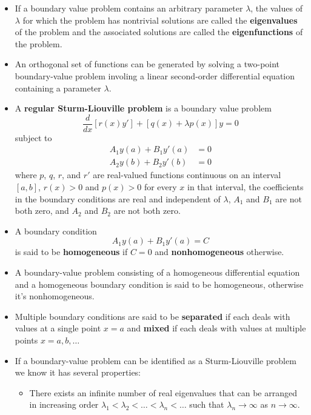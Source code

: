 \documentclass{article}
\begin{document}
\begin{itemize}
  \item If a boundary value problem contains an arbitrary parameter $\lambda$, the values of $\lambda$ for which the problem has nontrivial solutions are called the \textbf{eigenvalues} of the problem and the associated solutions are called the \textbf{eigenfunctions} of the problem.

  \item An orthogonal set of functions can be generated by solving a two-point boundary-value problem involing a linear second-order differential equation containing a parameter $\lambda$.

  \item A \textbf{regular Sturm-Liouville problem} is a boundary value problem \[\frac{d}{d x} [r(x) y'] + [q(x) + \lambda p(x)] y = 0\] subject to \begin{align*}
          A_1 y(a) + B_1 y'(a) & = 0 \\
          A_2 y(b) + B_2 y'(b) & = 0
        \end{align*} where $p$, $q$, $r$, and $r'$ are real-valued functions continuous on an interval $[a, b]$, $r(x) > 0$ and $p(x) > 0$ for every $x$ in that interval, the coefficients in the boundary conditions are real and independent of $\lambda$, $A_1$ and $B_1$ are not both zero, and $A_2$ and $B_2$ are not both zero.

  \item A boundary condition \[A_1 y(a) + B_1 y'(a) = C\] is said to be \textbf{homogeneous} if $C = 0$ and \textbf{nonhomogeneous} otherwise.

  \item A boundary-value problem consisting of a homogeneous differential equation and a homogeneous boundary condition is said to be homogeneous, otherwise it's nonhomogeneous.

  \item Multiple boundary conditions are said to be \textbf{separated} if each deals with values at a single point $x = a$ and \textbf{mixed} if each deals with values at multiple points $x = a, b, \ldots$

  \item If a boundary-value problem can be identified as a Sturm-Liouville problem we know it has several properties:

        \begin{itemize}
          \item There exists an infinite number of real eigenvalues that can be arranged in increasing order $\lambda_1 < \lambda_2 < \ldots < \lambda_n < \ldots$ such that $\lambda_n \rightarrow \infty$ as $n \rightarrow \infty$.


\end{itemize}
\end{itemize}
\end{document}
